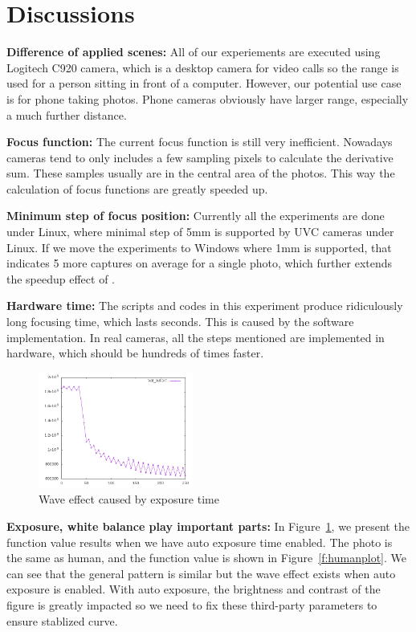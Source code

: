 \section{Discussions}

\textbf{Difference of applied scenes:}
All of our experiements are executed using Logitech C920 camera, which is a desktop camera for video calls so the range is used for a person sitting in front of a computer.
However, our potential use case is for phone taking photos.
Phone cameras obviously have larger range, especially a much further distance.

\textbf{Focus function:}
The current focus function is still very inefficient.
Nowadays cameras tend to only includes a few sampling pixels to calculate the derivative sum.
These samples usually are in the central area of the photos.
This way the calculation of focus functions are greatly speeded up.

\textbf{Minimum step of focus position:}
Currently all the experiments are done under Linux, where minimal step of 5mm is supported by UVC cameras under Linux.
If we move the experiments to Windows where 1mm is supported, that indicates 5 more captures on average for a single photo, which further extends the speedup effect of \sysname.

\textbf{Hardware time:}
The scripts and codes in this experiment produce ridiculously long focusing time, which lasts seconds.
This is caused by the software implementation.
In real cameras, all the steps mentioned are implemented in hardware, which should be hundreds of times faster.

\begin{figure}[tb!]
	\begin{center}
		\includegraphics[width=2in]{outplot}
	\end{center}
	\caption{Wave effect caused by exposure time}
	\label{f:outplot}
\end{figure}

\textbf{Exposure, white balance play important parts:}
In Figure~\ref{f:outplot}, we present the function value results when we have auto exposure time enabled.
The photo is the same as human, and the function value is shown in Figure~\ref{f:humanplot}.
We can see that the general pattern is similar but the wave effect exists when auto exposure is enabled.
With auto exposure, the brightness and contrast of the figure is greatly impacted so we need to fix these third-party parameters to ensure stablized curve.
